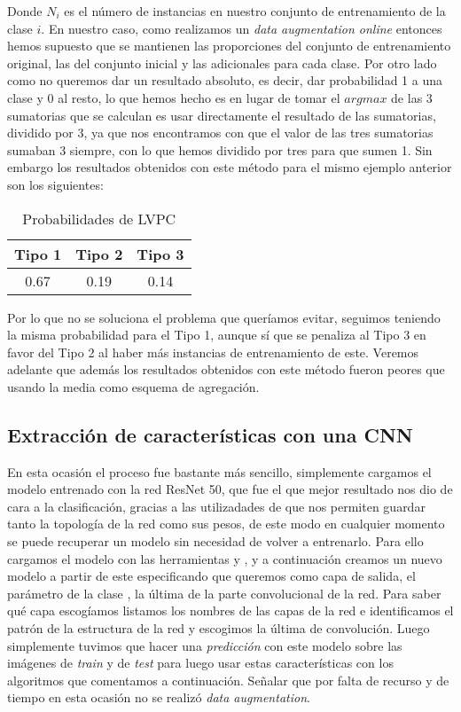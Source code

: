 Donde $N_i$ es el número de instancias en nuestro conjunto de entrenamiento de la clase $i$. En nuestro caso, como realizamos un \textit{data augmentation online} entonces hemos supuesto que se mantienen las proporciones del conjunto de entrenamiento original, las del conjunto inicial y las adicionales para cada clase. Por otro lado como no queremos dar un resultado absoluto, es decir, dar probabilidad 1 a una clase y 0 al resto, lo que hemos hecho es en lugar de tomar el $argmax$ de las 3 sumatorias que se calculan es usar directamente el resultado de las sumatorias, dividido por 3, ya que nos encontramos con que el valor de las tres sumatorias sumaban 3 siempre, con lo que hemos dividido por tres para que sumen 1. Sin embargo los resultados obtenidos con este método para el mismo ejemplo anterior son los siguientes:

\begin{table}[H]
\centering
\caption{Probabilidades de LVPC}
\begin{tabular}{|c|c|c|}
\hline
Tipo 1 & Tipo 2 & Tipo 3 \\ \hline
0.67   & 0.19   & 0.14   \\ \hline
\end{tabular}
\end{table}

Por lo que no se soluciona el problema que queríamos evitar, seguimos teniendo la misma probabilidad para el Tipo 1, aunque sí que se penaliza al Tipo 3 en favor del Tipo 2 al haber más instancias de entrenamiento de este. Veremos adelante que además los resultados obtenidos con este método fueron peores que usando la media como esquema de agregación.

\subsection{Extracción de características con una CNN}

En esta ocasión el proceso fue bastante más sencillo, simplemente cargamos el modelo entrenado con la red ResNet 50, que fue el que mejor resultado nos dio de cara a la clasificación, gracias a las utilizadades de  que nos permiten guardar tanto la topología de la red como sus pesos, de este modo en cualquier momento se puede recuperar un modelo sin necesidad de volver a entrenarlo. Para ello cargamos el modelo con las herramientas  y , y a continuación creamos un nuevo modelo a partir de este especificando que queremos como capa de salida, el parámetro  de la clase , la última de la parte convolucional de la red. Para saber qué capa escogíamos listamos los nombres de las capas de la red e identificamos el patrón de la estructura de la red y escogimos la última de convolución. Luego simplemente tuvimos que hacer una \textit{predicción} con este modelo sobre las imágenes de \textit{train} y de \textit{test} para luego usar estas características con los algoritmos que comentamos a continuación. Señalar que por falta de recurso y de tiempo en esta ocasión no se realizó \textit{data augmentation}.\\

